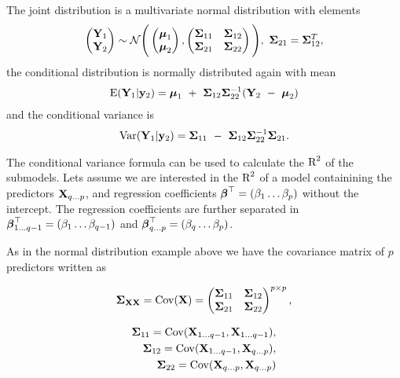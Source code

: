 \documentclass[11pt,a4paper,twoside]{book}
\begin{document}
The joint distribution is a multivariate normal distribution with elements
\begin{align*}
\begin{pmatrix}
\mathbf{Y}_{1} \\ 
\mathbf{Y}_{2} \end{pmatrix} \sim \mathcal{N}
\Bigg(\begin{pmatrix}
\boldsymbol{\mu}_{1} \\ 
\boldsymbol{\mu}_{2} 
\end{pmatrix},
\begin{pmatrix}
{\boldsymbol{\Sigma}}{}_{11} & {\boldsymbol{\Sigma}}{}_{12} \\
{\boldsymbol{\Sigma}}{}_{21} & {\boldsymbol{\Sigma}}{}_{22} \\
\end{pmatrix}\Bigg),
\ {\boldsymbol{\Sigma}}{}_{21} = {\boldsymbol{\Sigma}}{}_{12}^{T},
\end{align*}
the conditional distribution is normally distributed again with mean 
\begin{align*}
\E (\mathbf{Y}_{1} | \mathbf{y}_{2} ) = \boldsymbol{\mu}_{1}\ +\ \bSigma_{12} \bSigma_{22}^{-1}(\mathbf{Y}_{2}\ -\ \boldsymbol{\mu}_{2})
\end{align*}
and the conditional variance is
\begin{align*}
\operatorname{Var} ( \mathbf{Y}_{1} | \mathbf{y}_{2} ) = {\boldsymbol{\Sigma}}{}_{11}\ -\ {\boldsymbol{\Sigma}}{}_{12} {\boldsymbol{\Sigma}}{}_{22}^{-1}{\boldsymbol{\Sigma}}{}_{21} \text{.}
\end{align*}

The conditional variance formula can be used to calculate the $\text{R}^2$ of the submodels. Lets assume we are interested in the $\text{R}^2$ of a model containining the predictors ${\mathbf{X}}_{q...p}$, and regression coefficients ${\boldsymbol{\beta}}^\top = (\beta_{1} \dots \beta_{p})$ without the intercept. The regression coefficients are further separated in ${\boldsymbol{\beta}}^\top_{1 \dots q-1} = (\beta_{1} \dots \beta_{q-1})$ and ${\boldsymbol{\beta}}^\top_{q \dots p} = (\beta_{q} \dots \beta_{p})$. 

As in the normal distribution example above we have the covariance matrix of $p$ predictors written as 

      \begin{align} 
	{\boldsymbol{\Sigma}}{}_{{\mathbf{X}} {\mathbf{X}}} =	\operatorname{Cov}({\mathbf{X}}) = \begin{pmatrix}
{\boldsymbol{\Sigma}}{}_{11} & {\boldsymbol{\Sigma}}{}_{12} \\
{\boldsymbol{\Sigma}}{}_{21} & {\boldsymbol{\Sigma}}{}_{22}  \\
\end{pmatrix}^{p \times p}, 
   \end{align}
   
         \begin{align} 
   {\boldsymbol{\Sigma}}{}_{11} = \operatorname{Cov}({\mathbf{X}}_{1\dots q-1}, {\mathbf{X}}_{1 \dots q-1}), \\ {\boldsymbol{\Sigma}}{}_{12} = \operatorname{Cov}({\mathbf{X}}_{1\dots q-1}, {\mathbf{X}}_{q \dots p}),\\ {\boldsymbol{\Sigma}}{}_{22} = \operatorname{Cov}({\mathbf{X}}_{q \dots p}, {\mathbf{X}}_{q \dots p}) \nonumber
      \end{align}
      
\end{document}
